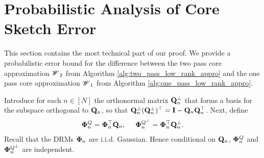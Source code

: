 \section{Probabilistic Analysis of Core Sketch Error}
This section contains the most technical part of our proof.
We provide a probabilistic error bound for the difference between the
two pass core approximation $\T{W}_2$
from Algorithm \ref{alg:two_pass_low_rank_appro}
and the one pass core approximation $\T{W}_1$
from Algorithm \ref{alg:one_pass_low_rank_appro}.

Introduce for each $n\in[N]$ the orthonormal matrix $\mathbf{Q}_n^\bot$ that forms
a basis for the subspace orthogonal to $\mathbf{Q}_n$, so that
$\mathbf{Q}_n^\bot (\mathbf{Q}_n^\bot)^\top = \mathbf{I} - \mathbf{Q}_n\mathbf{Q}_n^\top$.
Next, define
\begin{equation}
\label{eq: def-proj-Q}
\begin{aligned}
\M{\Phi}_n^Q = \M{\Phi}^\top_n \M{Q}_n  ,~~~~\M{\Phi}_n^{Q^\bot} = \M{\Phi}^\top_n \M{Q}_n^\bot.
\end{aligned}
\end{equation}
Recall that the DRMs $\mathbf{\Phi}_n$ are i.i.d. Gaussian. Hence conditional on $\mathbf{Q}_n$,
$\mathbf{\Phi}_n^Q$ and $\mathbf{\Phi}_n^{Q^\bot}$ are independent.

